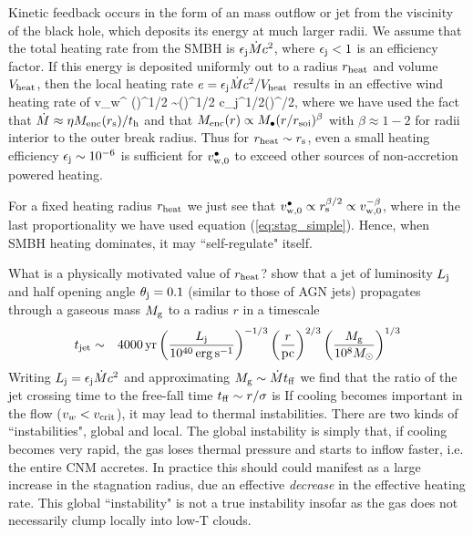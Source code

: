 \documentclass[usenatbib,fleqn]{mn2e}
\begin{document}
Kinetic feedback occurs in the form of an mass outflow or jet from the viscinity of the black hole, which deposits its energy at much larger radii.  We assume that the total heating rate from the SMBH is $\epsilon_{\rm j} \dot{M}c^{2}$, where $\epsilon_{\rm j} < 1$ is an efficiency factor.  If this energy is deposited uniformly out to a radius $r_{\rm heat}$ and volume $V_{\rm heat}$, then the local heating rate $e = \epsilon_{\rm j}\dot{M}c^{2}/V_{\rm heat}$ results in an effective wind heating rate of
\be
v_w^{\bullet} \approx  \left(\right)^{1/2} \sim \left(\right)^{1/2} \approx c\epsilon_{\rm j}^{1/2}\left(\right)^{\beta/2},
\ee
where we have used the fact that $\dot{M} \approx \eta M_{\rm enc}(r_{\rm s})/t_{\rm h}$ and that $M_{\rm enc}(r) \propto M_{\bullet}(r/r_{\rm soi})^{\beta}$ with $\beta \approx 1-2$ for radii interior to the outer break radius.  Thus for $r_{\rm heat} \sim r_{\rm s}$, even a small heating efficiency $\epsilon_{\rm j} \sim 10^{-6}$ is sufficient for $v_{\rm w,0}^{\bullet}$ to exceed other sources of non-accretion powered heating.  

For a fixed heating radius $r_{\rm heat}$ we just see that $v_{\rm
  w,0}^{\bullet} \propto r_{\rm s}^{\beta/2} \propto v_{\rm
  w,0}^{-\beta}$, where in the last proportionality we have used
equation (\ref{eq:stag_simple}).  Hence, when SMBH heating dominates,
it may ``self-regulate" itself.

What is a physically motivated value of $r_{\rm heat}$?
\citet{Bromberg+11} show that a jet of luminosity $L_{\rm j}$ and half
opening angle $\theta_{\rm j} = 0.1$ (similar to those of AGN jets)
propagates through a gaseous mass $M_{\rm g}$ to a radius $r$ in a
timescale
\begin{eqnarray}
t_{\rm jet} &\sim& 4000\,{\rm yr}\left(\frac{{L}_{\rm j}}{10^{40}\,\rm erg\,s^{-1}}\right)^{-1/3}\left(\frac{r}{\rm pc}\right)^{2/3}\left(\frac{M_{\rm g}}{10^{8}M_{\odot}}\right)^{1/3} 
\end{eqnarray}
Writing $L_{\rm j} = \epsilon_{\rm j}\dot{M}c^{2}$ and approximating $M_{\rm g} \sim \dot{M}t_{\rm ff}$ we find that the ratio of the jet crossing time to the free-fall time $t_{\rm ff} \sim r/\sigma$ is 
If cooling becomes important in the flow ($v_{w} < v_{\rm crit}$), it may lead to thermal instabilities.  There are two kinds of ``instabilities", global and local.  The global instability is simply that, if cooling becomes very rapid, the gas loses thermal pressure and starts to inflow faster, i.e. the entire CNM accretes.  In
practice this should could manifest as a large increase in the stagnation radius, due an effective {\it decrease} in the effective heating rate.  This global ``instability" is not a true instability insofar as the gas does not necessarily clump locally into low-T clouds.
\end{document}
